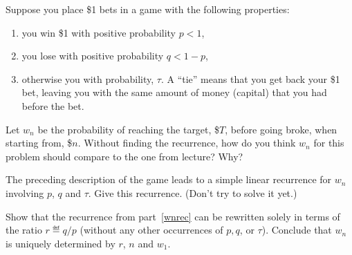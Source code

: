 \documentclass[11pt,twoside]{article}
\begin{document}
  
\begin{problem}
  Suppose you place \$1 bets in a game with the following properties:
  \begin{enumerate}
  \item you win \$1 with positive probability $p<1$,
  \item you lose with positive probability $q < 1-p$,
  \item otherwise you  with probability, $\tau$.  A ``tie'' means
    that you get back your \$1 bet, leaving you with the same amount of
    money (capital) that you had before the bet.
  \end{enumerate}
  
  \bparts

  \ppart Let $w_n$ be the probability of reaching the target, \$$T$,
  before going broke, when starting from, \$$n$.  Without finding the
  recurrence, how do you think $w_n$ for this problem should compare to
  the one from lecture?  Why?
 
  \ppart\label{wnrec} The preceding description of the game leads to a
  simple linear recurrence for $w_n$ involving $p$, $q$ and $\tau$.  Give
  this recurrence.  (Don't try to solve it yet.)


\iffalse
Shifting $n$ by 1 yields
\[
    w_n = \frac{1-\tau}{p}w_{n-1} - \frac{q}{p}w_{n-2},
\]
  for $n \geq 2$.\fi

  \ppart\label{rrec} Show that the recurrence from part~\ref{wnrec} can be rewritten
  solely in terms of the ratio $r \eqdef q/p$ (without any other
  occurrences of $p,q$, or $\tau$).  Conclude that $w_n$ is uniquely
  determined by $r$, $n$ and $w_1$.



\end{problem}
\end{document}
